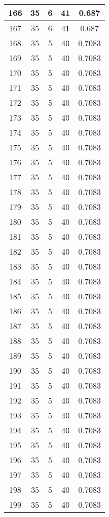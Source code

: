\documentclass[letterpaper, 12pt]{article}
\begin{document}
\begin{longtable}{|c|c|c|c|c|}
\hline
166 & 35 & 6 & 41 & 0.687 \\
\hline
167 & 35 & 6 & 41 & 0.687 \\
\hline
168 & 35 & 5 & 40 & 0.7083 \\
\hline
169 & 35 & 5 & 40 & 0.7083 \\
\hline
170 & 35 & 5 & 40 & 0.7083 \\
\hline
171 & 35 & 5 & 40 & 0.7083 \\
\hline
172 & 35 & 5 & 40 & 0.7083 \\
\hline
173 & 35 & 5 & 40 & 0.7083 \\
\hline
174 & 35 & 5 & 40 & 0.7083 \\
\hline
175 & 35 & 5 & 40 & 0.7083 \\
\hline
176 & 35 & 5 & 40 & 0.7083 \\
\hline
177 & 35 & 5 & 40 & 0.7083 \\
\hline
178 & 35 & 5 & 40 & 0.7083 \\
\hline
179 & 35 & 5 & 40 & 0.7083 \\
\hline
180 & 35 & 5 & 40 & 0.7083 \\
\hline
181 & 35 & 5 & 40 & 0.7083 \\
\hline
182 & 35 & 5 & 40 & 0.7083 \\
\hline
183 & 35 & 5 & 40 & 0.7083 \\
\hline
184 & 35 & 5 & 40 & 0.7083 \\
\hline
185 & 35 & 5 & 40 & 0.7083 \\
\hline
186 & 35 & 5 & 40 & 0.7083 \\
\hline
187 & 35 & 5 & 40 & 0.7083 \\
\hline
188 & 35 & 5 & 40 & 0.7083 \\
\hline
189 & 35 & 5 & 40 & 0.7083 \\
\hline
190 & 35 & 5 & 40 & 0.7083 \\
\hline
191 & 35 & 5 & 40 & 0.7083 \\
\hline
192 & 35 & 5 & 40 & 0.7083 \\
\hline
193 & 35 & 5 & 40 & 0.7083 \\
\hline
194 & 35 & 5 & 40 & 0.7083 \\
\hline
195 & 35 & 5 & 40 & 0.7083 \\
\hline
196 & 35 & 5 & 40 & 0.7083 \\
\hline
197 & 35 & 5 & 40 & 0.7083 \\
\hline
198 & 35 & 5 & 40 & 0.7083 \\
\hline
199 & 35 & 5 & 40 & 0.7083 \\
\hline
\end{longtable}
\end{document}
